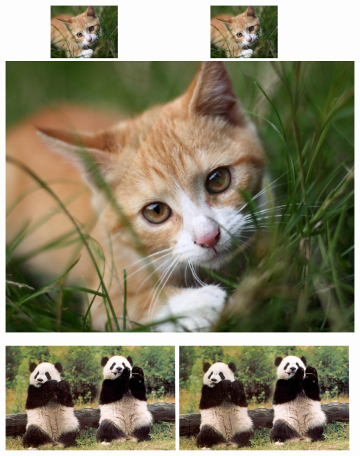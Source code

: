 \documentclass[a4paper, 11pt]{article}
\begin{document}
    \noindent \includegraphics[width=6cm,height=2cm]{img/chat.jpg}
    \shortstack{1cm \\ \rule{1cm}{1cm}}
    \includegraphics[width=6cm,height=2cm,keepaspectratio]{img/chat.jpg}
    \includegraphics[scale=0.1]{img/chat.jpg}

    \noindent \includegraphics[height=4cm]{img/panda.jpg}
    \shortstack{1cm \\ \rule{1cm}{1cm}}
    \includegraphics[height=4cm,clip,trim=1cm 0cm 8cm 1cm]{img/panda.jpg} %
\end{document}
